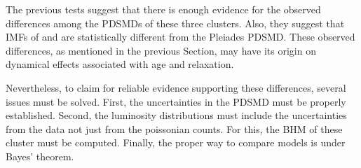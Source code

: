 The previous tests suggest that there is enough evidence for the observed differences among the PDSMDs of these three clusters. Also, they suggest that IMFs of \citet{Chabrier2005} and \citet{Thies2007} are statistically different from the  Pleiades PDSMD.  These observed differences, as mentioned in the previous Section, may have its origin on dynamical effects associated with age and relaxation.

 Nevertheless, to claim for reliable evidence supporting these differences, several issues must be solved. First, the uncertainties in the PDSMD must be properly established. Second, the luminosity distributions must include the uncertainties from the data not just from the poissonian counts. For this, the BHM of these cluster must be computed. Finally, the proper way to compare models is under Bayes' theorem.
 




